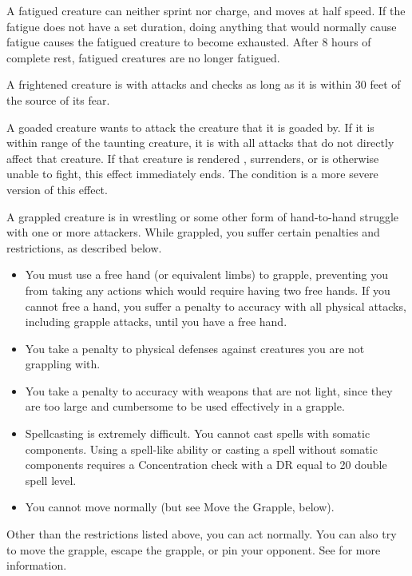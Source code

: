  A fatigued creature can neither sprint nor charge, and moves at half speed. If the fatigue does not have a set duration, doing anything that would normally cause fatigue causes the fatigued creature to become exhausted. After 8 hours of complete rest, fatigued creatures are no longer fatigued.

 A frightened creature is \severelyimpaired with attacks and checks as long as it is within 30 feet of the source of its fear.

 A goaded creature wants to attack the creature that it is goaded by.
If it is within \rngmed range of the taunting creature, it is \impaired with all attacks that do not directly affect that creature.
If that creature is rendered \helpless, surrenders, or is otherwise unable to fight, this effect immediately ends.
The  condition is a more severe version of this effect.

 A grappled creature is in wrestling or some other form of hand-to-hand struggle with one or more attackers. While grappled, you suffer certain penalties and restrictions, as described below.

\begin{itemize}
    \item You must use a free hand (or equivalent limbs) to grapple, preventing you from taking any actions which would require having two free hands. If you cannot free a hand, you suffer a  penalty to accuracy with all physical attacks, including grapple attacks, until you have a free hand.
    \item You take a  penalty to physical defenses against creatures you are not grappling with.
    \item You take a  penalty to accuracy with weapons that are not light, since they are too large and cumbersome to be used effectively in a grapple.
    \item Spellcasting is extremely difficult. You cannot cast spells with somatic components. Using a spell-like ability or casting a spell without somatic components requires a Concentration check with a DR equal to 20 \add double spell level.
    \item You cannot move normally (but see Move the Grapple, below).
\end{itemize}

Other than the restrictions listed above, you can act normally. You can also try to move the grapple, escape the grapple, or pin your opponent. See  for more information.

